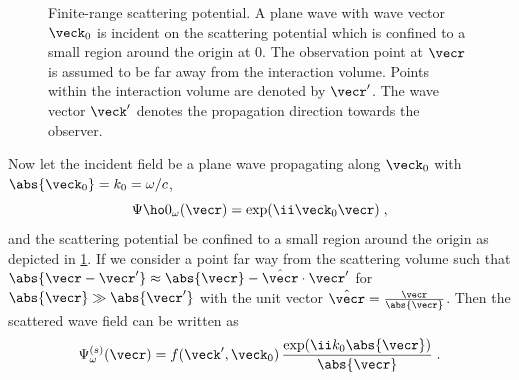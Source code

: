 \documentclass[
twoside,
openright,
titlepage,
numbers=noenddot,
headinclude,
fleqn,
a4paper,
footinclude=true,
cleardoublepage=empty,
abstractoff,
BCOR=5mm,
paper=a4,
fontsize=11pt,
british,ngerman,american,
]{scrreprt}
\begin{document}
\begin{figure}
  \centering
  \caption[Finite-range scattering potential.]{Finite-range scattering
    potential. A plane wave with wave vector $\veck_0$ is incident on
    the scattering potential which is confined to a small region
    around the origin at $0$. The observation point at $\vecr$ is
    assumed to be far away from the interaction volume.  Points within
    the interaction volume are denoted by $\vecr'$.  The wave vector
    $\veck'$ denotes the propagation direction towards the observer. }
  \label{fig:scattering}
\end{figure}
Now let the incident field be a plane wave propagating along
$\veck_0$ with $\abs{\veck_0}=k_0=\omega/c$,
\begin{equation}
  \label{eq:incident-plane-wave}
  \Psi\ho0_\omega(\vecr) = \exp(\ii \veck_0\vecr) \;,
\end{equation}
and the scattering potential be confined to a small region around the
origin as depicted in \cref{fig:scattering}.  If we consider a point
far way from the scattering volume such that
$\abs{\vecr-\vecr'}\approx \abs{\vecr}-\hat{\vecr}\cdot\vecr'$ for
$\abs{\vecr}\gg\abs{\vecr'}$ with the unit vector
$\hat{\vecr}=\frac{\vecr}{\abs{\vecr}}$.  Then the scattered wave
field can be written as
\begin{equation}
  \label{eq:scattered-wave}
  \Psi^{(s)}_\omega(\vecr) = 
  f(\veck',\veck_0)\,\frac{\exp(\ii k_0\abs{\vecr})}{\abs{\vecr}} \;.
\end{equation}
\end{document}

